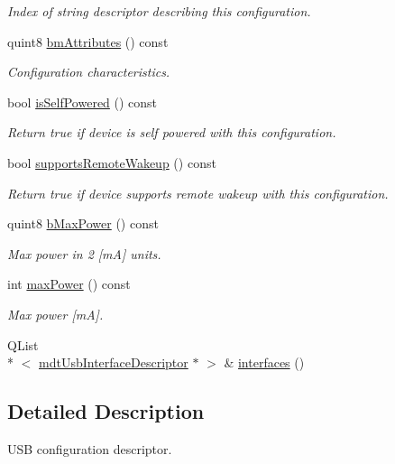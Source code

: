 \begin{DoxyCompactItemize}
\begin{DoxyCompactList}\small\item\em Index of string descriptor describing this configuration. \end{DoxyCompactList}\item 
quint8 \hyperlink{classmdt_usb_config_descriptor_a742b547cbf9e07de7cec89947095bb52}{bm\-Attributes} () const 
\begin{DoxyCompactList}\small\item\em Configuration characteristics. \end{DoxyCompactList}\item 
bool \hyperlink{classmdt_usb_config_descriptor_a5b8625a40bcca3025419606293b62650}{is\-Self\-Powered} () const 
\begin{DoxyCompactList}\small\item\em Return true if device is self powered with this configuration. \end{DoxyCompactList}\item 
bool \hyperlink{classmdt_usb_config_descriptor_a307f766cfd0cb917490b7d0e4dd7a3ec}{supports\-Remote\-Wakeup} () const 
\begin{DoxyCompactList}\small\item\em Return true if device supports remote wakeup with this configuration. \end{DoxyCompactList}\item 
quint8 \hyperlink{classmdt_usb_config_descriptor_af0bc21aa2f6ebba7069cd9403520a41b}{b\-Max\-Power} () const 
\begin{DoxyCompactList}\small\item\em Max power in 2 \mbox{[}m\-A\mbox{]} units. \end{DoxyCompactList}\item 
int \hyperlink{classmdt_usb_config_descriptor_ad5d10e65295be09359ebf3e775e2e1bd}{max\-Power} () const 
\begin{DoxyCompactList}\small\item\em Max power \mbox{[}m\-A\mbox{]}. \end{DoxyCompactList}\item 
Q\-List\\*
$<$ \hyperlink{classmdt_usb_interface_descriptor}{mdt\-Usb\-Interface\-Descriptor} $\ast$ $>$ \& \hyperlink{classmdt_usb_config_descriptor_ae318f7d3572fdb3bdab9e4152fe7d80b}{interfaces} ()
\end{DoxyCompactItemize}


\subsection{Detailed Description}
U\-S\-B configuration descriptor. 

